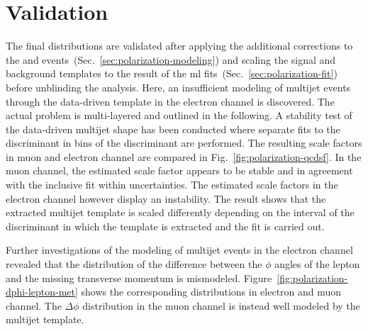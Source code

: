 \section{Validation}

The final distributions are validated after applying the additional corrections to the \wjets and \ttbar events~(Sec.~\ref{sec:polarization-modeling}) and scaling the signal and background templates to the result of the \gls{ml} fits~(Sec.~\ref{sec:polarization-fit}) before unblinding the analysis. Here, an insufficient modeling of multijet events through the data-driven template in the electron channel is discovered. The actual problem is multi-layered and outlined in the following. A stability test of the data-driven multijet shape has been conducted where separate fits to the \bdtqcd discriminant in bins of the \bdttch discriminant are performed. The resulting scale factors in muon and electron channel are compared in Fig.~\ref{fig:polarization-qcdsf}. In the muon channel, the estimated scale factor appears to be stable and in agreement with the inclusive fit within uncertainties. The estimated scale factors in the electron channel however display an instability. The result shows that the extracted multijet template is scaled differently depending on the interval of the \bdttch discriminant in which the template is extracted and the fit is carried out. 


Further investigations of the modeling of multijet events in the electron channel revealed that the distribution of the difference between the $\phi$ angles of the lepton and the missing transverse momentum is mismodeled. Figure~\ref{fig:polarization-dphi-lepton-met} shows the corresponding distributions in electron and muon channel. The $\Delta\phi$ distribution in the muon channel is instead well modeled by the multijet template.

